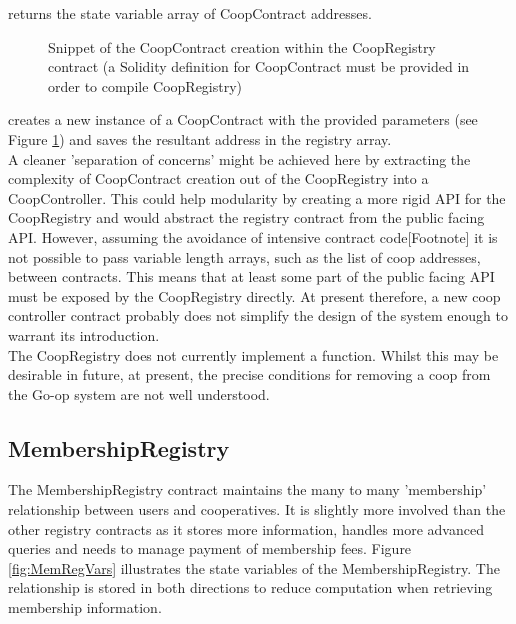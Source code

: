  returns the state variable array of CoopContract addresses. \\
 \begin{figure}
\centering
{}
\decoRule
\caption[CoopRegistry Coop Creation Snippet]{Snippet of the CoopContract creation within the CoopRegistry contract (a Solidity definition for CoopContract must be provided in order to compile CoopRegistry) }
\label{fig:CoopRegistry}
\end{figure}

 creates a new instance of a CoopContract with the provided parameters (see Figure \ref{fig:CoopRegistry}) and saves the resultant address in the registry array.\\

A cleaner 'separation of concerns' might be achieved here by extracting the complexity of CoopContract creation out of the CoopRegistry into a CoopController. This could help modularity by creating a more rigid API for the CoopRegistry and would abstract the registry contract from the public facing API. However, assuming the avoidance of intensive contract code[Footnote] it is not possible to pass variable length arrays, such as the list of coop addresses, between contracts. This means that at least some part of the public facing API must be exposed by the CoopRegistry directly. At present therefore, a new coop controller contract probably does not simplify the design of the system enough to warrant its introduction. \\

The CoopRegistry does not currently implement a  function. Whilst this may be desirable in future, at present, the precise conditions for removing a coop from the Go-op system are not well understood. \\

\subsection{MembershipRegistry}
The MembershipRegistry contract maintains the many to many 'membership' relationship between users and cooperatives. It is slightly more involved than the other registry contracts as it stores more information, handles more advanced queries and needs to manage payment of membership fees. Figure \ref{fig:MemRegVars} illustrates the state variables of the MembershipRegistry. The relationship is stored in both directions to reduce computation when retrieving membership information. \\

